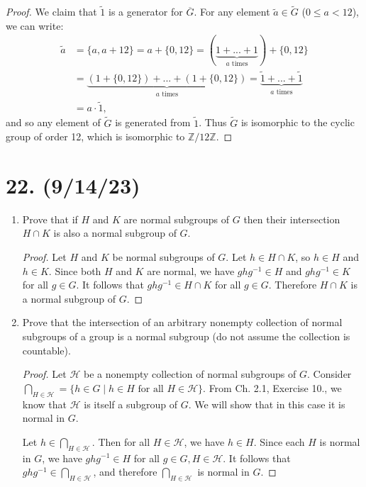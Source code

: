 \documentclass{article}
\begin{document}
\begin{enumerate}[label=(\alph*), itemsep=0em]
\begin{proof}
            We claim that $\widetilde{1}$ is a generator for $\overline{G}$. For any element $\widetilde{a} \in \widetilde{G}$ ($0 \leq a < 12$), we can write:
            \begin{align*}
                \widetilde{a} &= \{ a, a + 12 \} = a + \{ 0, 12 \} = (\underbrace{1 + ... + 1}_{a \text{ times}}) + \{ 0, 12 \} \\ 
                &= \underbrace{(1 + \{ 0, 12 \}) + ... + (1 + \{ 0, 12 \})}_{a \text{ times}} = \underbrace{\widetilde{1} + ... + \widetilde{1}}_{a \text{ times}} \\
                &= a \cdot \widetilde{1},
            \end{align*}
            and so any element of $\widetilde{G}$ is generated from $\widetilde{1}$. Thus $\widetilde{G}$ is isomorphic to the cyclic group of order 12, which is isomorphic to $\mathbb{Z}/12\mathbb{Z}$.
          \end{proof}
\end{enumerate}

\section*{22. (9/14/23)}

\begin{enumerate}[label=(\alph*), itemsep=0em]
    \item Prove that if $H$ and $K$ are normal subgroups of $G$ then their intersection $H \cap K$ is also a normal subgroup of $G$.
          \begin{proof}
            Let $H$ and $K$ be normal subgroups of $G$. Let $h \in H \cap K$, so $h \in H$ and $h \in K$. Since both $H$ and $K$ are normal, we have $ghg^{-1} \in H$ and $ghg^{-1} \in K$ for all $g \in G$. It follows that $ghg^{-1} \in H \cap K$ for all $g \in G$. Therefore $H \cap K$ is a normal subgroup of $G$.
          \end{proof}
    \item Prove that the intersection of an arbitrary nonempty collection of normal subgroups of a group is a normal subgroup (do not assume the collection is countable).
          \begin{proof}
            Let $\mathcal{H}$ be a nonempty collection of normal subgroups of $G$. Consider $\bigcap_{H \in \mathcal{H}} = \{ h \in G \mid h \in H \text{ for all } H \in \mathcal{H} \}$. From Ch. 2.1, Exercise 10., we know that $\mathcal{H}$ is itself a subgroup of $G$. We will show that in this case it is normal in $G$.

            Let $h \in \bigcap_{H \in \mathcal{H}}$. Then for all $H \in \mathcal{H}$, we have $h \in H$. Since each $H$ is normal in $G$, we have $ghg^{-1} \in H$ for all $g \in G, H \in \mathcal{H}$. It follows that $ghg^{-1} \in \bigcap_{H \in \mathcal{H}}$, and therefore $\bigcap_{H \in \mathcal{H}}$ is normal in $G$.
          \end{proof}
\end{enumerate}
\end{document}
